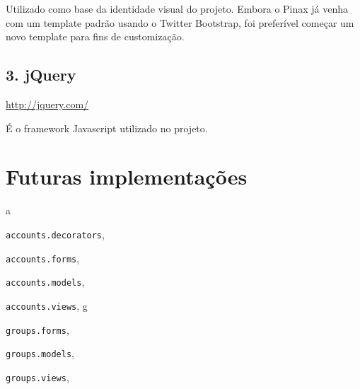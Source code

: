\documentclass[letterpaper,10pt,brazil]{sphinxmanual}
\begin{document}
Utilizado como base da identidade visual do projeto. Embora o Pinax já venha com um template padrão usando o Twitter Bootstrap, foi preferível começar um novo template para fins de customização.


\subsection{3. jQuery}
\label{bibliotecas:jquery}
\href{http://jquery.com/}{http://jquery.com/}

É o framework Javascript utilizado no projeto.


\section{Futuras implementações}
\label{futuro::doc}\label{futuro:futuras-implementacoes}

\renewcommand{\indexname}{Índice de Módulos do Python}
\begin{theindex}
\def\bigletter#1{{\Large\sffamily#1}\nopagebreak\vspace{1mm}}
\bigletter{a}
\item {\texttt{accounts.decorators}}, \pageref{apps/accounts:module-accounts.decorators}
\item {\texttt{accounts.forms}}, \pageref{apps/accounts:module-accounts.forms}
\item {\texttt{accounts.models}}, \pageref{apps/accounts:module-accounts.models}
\item {\texttt{accounts.views}}, \pageref{apps/accounts:module-accounts.views}
\indexspace
\bigletter{g}
\item {\texttt{groups.forms}}, \pageref{apps/groups:module-groups.forms}
\item {\texttt{groups.models}}, \pageref{apps/groups:module-groups.models}
\item {\texttt{groups.views}}, \pageref{apps/groups:module-groups.views}
\end{theindex}

\renewcommand{\indexname}{Índice}
\printindex
\end{document}

